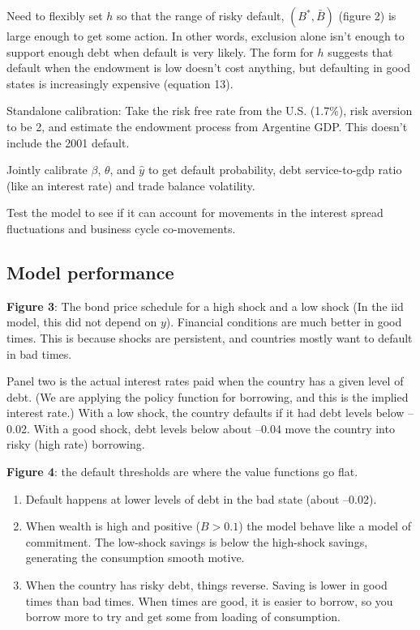 \documentclass[11pt, pdftex]{article}
\begin{document}
Need to flexibly set $h$ so that the range of risky default, $(B^*, \bar{B})$ (figure 2) is large enough to get some action.  In other words, exclusion alone isn't enough to support enough debt when default is very likely. The form for $h$ suggests that default when the endowment is low doesn't cost anything, but defaulting in good states is increasingly expensive  (equation 13).

Standalone calibration: Take the risk free rate from the U.S. (1.7\%), risk aversion to be 2, and estimate the endowment process from Argentine GDP.  This doesn't include the 2001 default.

Jointly calibrate $\beta$, $\theta$, and $\hat{y}$ to get default probability, debt service-to-gdp ratio (like an interest rate) and trade balance volatility.

Test the model to see if it can account for movements in the interest spread fluctuations and business cycle co-movements.
\subsection*{Model performance}

\textbf{Figure 3}:  The bond price schedule for a high shock and a low shock (In the iid model, this did not depend on $y$). Financial conditions are much better in good times.  This is because shocks are persistent, and countries mostly want to default in bad times.

Panel two is the actual interest rates paid when the country has a given level of debt.  (We are applying the policy function for borrowing, and this is the implied interest rate.)  With a low shock, the country defaults if it had debt levels below --0.02. With a good shock, debt levels below about --0.04 move the country into risky (high rate) borrowing.


\textbf{Figure 4}: the default thresholds are where the value functions go flat.
\begin{enumerate}
  \item Default happens at lower levels of debt in the bad state (about --0.02).
  \item When wealth is high and positive ($B>0.1$) the model behave like a model of commitment. The low-shock savings is below the high-shock savings, generating the consumption smooth motive.
  \item When the country has risky debt, things reverse. Saving is lower in good times than bad times. When times are good, it is easier to borrow, so you borrow more to try and get some from loading of consumption.
\end{enumerate}
\end{document}
